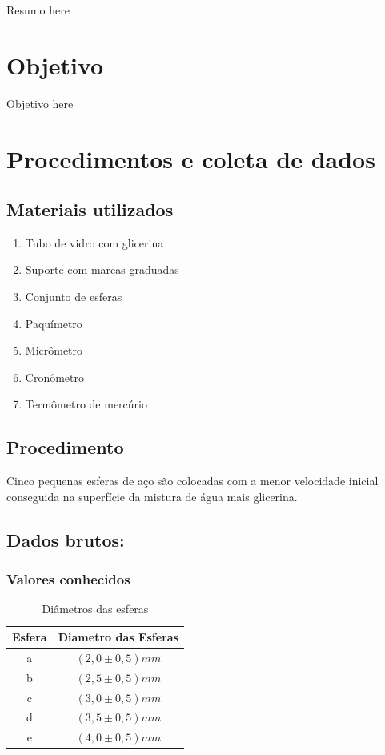 \documentclass[english,brazil]{article}
\providecommand{\tabularnewline}{\\}
\providecommand{\tabularnewline}{\\}
\begin{document}
	Resumo here

\section{Objetivo}

	Objetivo here

\section{Procedimentos e coleta de dados}


\subsection{Materiais utilizados}
	\begin{enumerate}
		\item Tubo de vidro com glicerina
		\item Suporte com marcas graduadas
		\item Conjunto de esferas
		\item Paquímetro 
		\item Micrômetro
		\item Cronômetro
		\item Termômetro de mercúrio
	\end{enumerate}

\subsection{Procedimento}

	Cinco pequenas esferas de aço são colocadas com a menor velocidade inicial conseguida na superfície da mistura de água mais glicerina.

\subsection{Dados brutos:}

\subsubsection{Valores conhecidos}

\begin{table}[H]
	\caption{Diâmetros das esferas}
	\centering{}%
	\begin{tabular}{|c|c|}
		\hline 
		Esfera & Diametro das Esferas \tabularnewline
		\hline 
		a & $(2,0\pm0,5)\unit{mm}$\tabularnewline
		\hline 
		b & $(2,5\pm0,5)\unit{mm}$\tabularnewline
		\hline 
		c & $(3,0\pm0,5)\unit{mm}$\tabularnewline
		\hline 
		d & $(3,5\pm0,5)\unit{mm}$\tabularnewline
		\hline 
		e & $(4,0\pm0,5)\unit{mm}$\tabularnewline
		\hline 
	\end{tabular}
\end{table}
\end{document}
